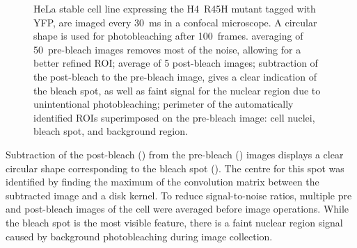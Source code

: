      \begin{figure}
        \centering
        \hfill
        \hfill
          {
            HeLa stable cell line expressing the H4~R45H mutant tagged with YFP,
            are imaged every \SI{30}{\ms} in a confocal microscope. A circular
            shape is used for photobleaching after 100~frames.
             averaging of 50~pre-bleach
            images removes most of the noise, allowing for a better refined
            ROI;
             average of
            5 post-bleach images;
             subtraction of the
            post-bleach to the pre-bleach image, gives a clear indication
            of the bleach spot, as well as faint signal for the nuclear
            region due to unintentional photobleaching;
             perimeter of the
            automatically identified ROIs superimposed on the pre-bleach
            image: cell nuclei, bleach spot, and background region.
          }
        \label{fig:kill-frap:roi}
      \end{figure}

      Subtraction of the post-bleach () from
      the pre-bleach () images displays
      a clear circular shape corresponding to the bleach spot ().
      The centre for this spot was identified by finding the maximum of the convolution matrix 
	  between the subtracted image and a disk kernel. 
	  To reduce signal-to-noise ratios, multiple pre and post-bleach images of the cell
	  were averaged before image operations. 
	  While the bleach spot is the most visible feature, there is a faint nuclear region signal
      caused by background photobleaching during image collection.

